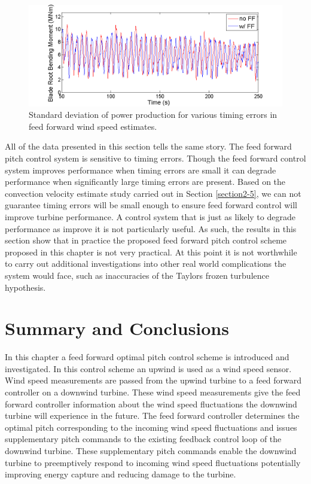 \begin{figure}[htbp]
	\centering
		\includegraphics[trim = {1cm 0 2cm 0}, clip, width = \linewidth]{Figures/ch3Figures/fig3-35.png}
		
	\caption{Standard deviation of power production for various timing errors in feed forward wind speed estimates.}
	\label{fig3-38}
\end{figure}

All of the data presented in this section tells the same story. The feed forward pitch control system is sensitive to timing errors. Though the feed forward control system improves performance when timing errors are small it can degrade performance when significantly large timing errors are present. Based on the convection velocity estimate study carried out in Section \ref{section2-5}, we can not guarantee timing errors will be small enough to ensure feed forward control will improve turbine performance. A control system that is just as likely to degrade performance as improve it is not particularly useful. As such, the results in this section show that in practice the proposed feed forward pitch control scheme proposed in this chapter is not very practical. At this point it is not worthwhile to carry out additional investigations into other real world complications the system would face, such as inaccuracies of the Taylors frozen turbulence hypothesis.

\section{Summary and Conclusions}

In this chapter a feed forward optimal pitch control scheme is introduced and investigated. In this control scheme an upwind is used as a wind speed sensor. Wind speed measurements are passed from the upwind turbine to a feed forward controller on a downwind turbine. These wind speed measurements give the feed forward controller information about the wind speed fluctuations the downwind turbine will experience in the future. The feed forward controller determines the optimal pitch corresponding to the incoming wind speed fluctuations and issues supplementary pitch commands to the existing feedback control loop of the downwind turbine. These supplementary pitch commands enable the downwind turbine to preemptively respond to incoming wind speed fluctuations potentially improving energy capture and reducing damage to the turbine.

